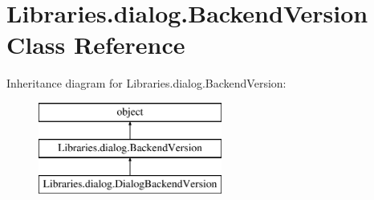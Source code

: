 \hypertarget{class_libraries_1_1dialog_1_1_backend_version}{}\section{Libraries.\+dialog.\+Backend\+Version Class Reference}
\label{class_libraries_1_1dialog_1_1_backend_version}
Inheritance diagram for Libraries.\+dialog.\+Backend\+Version\+:\begin{figure}[H]
\begin{center}
\leavevmode
\includegraphics[height=3.000000cm]{class_libraries_1_1dialog_1_1_backend_version}
\end{center}
\end{figure}
